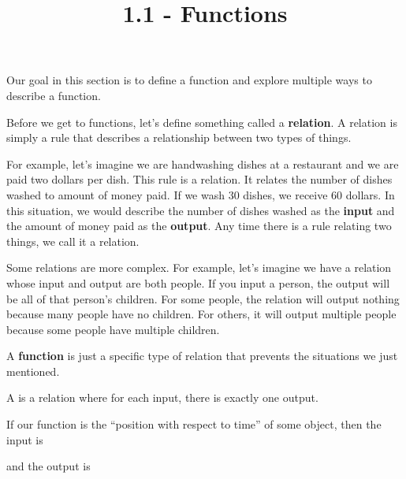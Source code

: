 \documentclass{ximera}
\title{1.1 - Functions}
\begin{document}
Our goal in this section is to define a function and explore multiple ways to describe a function.

Before we get to functions, let's define something called a \textbf{relation}. A relation is simply a rule that describes a relationship between two types of things.

For example, let's imagine we are handwashing dishes at a restaurant and we are paid two dollars per dish. This rule is a relation. It relates the number of dishes washed to amount of money paid. If we wash 30 dishes, we receive 60 dollars. In this situation, we would describe the number of dishes washed as the \textbf{input} and the amount of money paid as the \textbf{output}. Any time there is a rule relating two things, we call it a relation.

Some relations are more complex. For example, let's imagine we have a relation whose input and output are both people. If you input a person, the output will be all of that person's children. For some people, the relation will output nothing because many people have no children. For others, it will output multiple people because some people have multiple children. 

A \textbf{function} is just a specific type of relation that prevents the situations we just mentioned.

\begin{definition}
A  is a relation where for each input,
there is exactly one output.
\end{definition}

\begin{question}
  If our function is the ``position with respect to time'' of some
  object, then the input is
  \begin{multipleChoice}
  \end{multipleChoice}
  and the output is
  \begin{multipleChoice}
  \end{multipleChoice}
\end{question}
\end{document}
